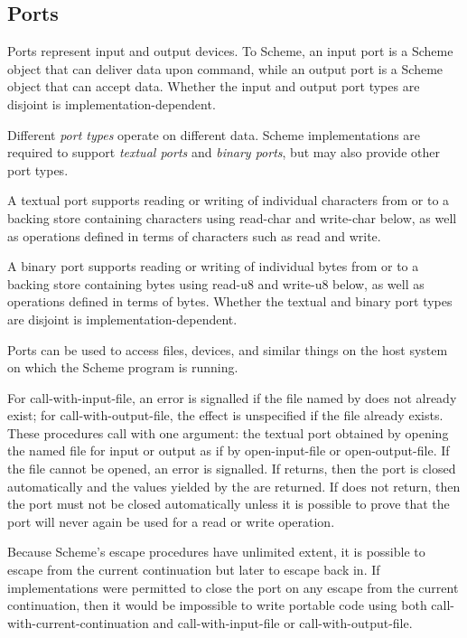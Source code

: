\subsection{Ports}
\label{portsection}

Ports represent input and output devices.  To Scheme, an input port is
a Scheme object that can deliver data upon command, while an output
port is a Scheme object that can accept data.
Whether the input and output port types are disjoint is
implementation-dependent.

Different {\em port types} operate on different data.  Scheme
imple\-men\-ta\-tions are required to support {\em textual ports}
and {\em binary ports}, but may also provide other port types.

A textual port supports reading or writing of individual characters
from or to a backing store containing characters
using {\cf read-char} and {\cf write-char} below, as well as operations
defined in terms of characters such as {\cf read} and {\cf write}.

A binary port supports reading or writing of individual bytes from
or to a backing store containing bytes using {\cf read-u8} and {\cf
write-u8} below, as well as operations defined in terms of bytes.
Whether the textual and binary port types are disjoint is
implementation-dependent.

Ports can be used to access files, devices, and similar things on the host
system on which the Scheme program is running.

\begin{entry}{%
}

For {\cf call-with-input-file},
an error is signalled if
the file named by  does not already exist; for
{\cf call-with-output-file},
the effect is unspecified if the file
already exists. These procedures call  with one argument: the
textual port obtained by opening the named file for input or output
as if by {\cf open-input-file} or {\cf open-output-file}.  If the
file cannot be opened, an error is signalled.  If  returns,
then the port is closed automatically and the values yielded by the
 are returned.  If  does not return, then 
the port must not be closed automatically unless it is possible to
prove that the port will never again be used for a read or write
operation.

\begin{rationale}
Because Scheme's escape procedures have unlimited extent, it  is
possible to escape from the current continuation but later to escape back in. 
If implementations were permitted to close the port on any escape from the
current continuation, then it would be impossible to write portable code using
both {\cf call-with-current-continuation} and {\cf call-with-input-file} or
{\cf call-with-output-file}.
\end{rationale} 
\end{entry}

